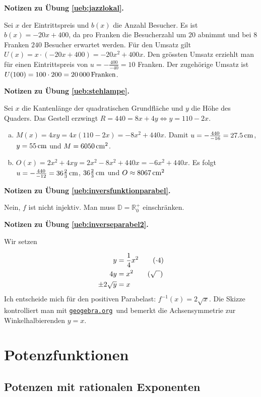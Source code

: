 \documentclass[%
11pt,%
twoside,%
titlepage,%
german,%
headsepline%
]{scrartcl}
\newcommand{\geogebralink}{\href{https://www.geogebra.org/calculator}{\texttt{geogebra.org}}}
\newcommand{\concatueb}[1]{ueb:#1}%
\newcommand{\concatlsg}[1]{lsg:#1}%
\newenvironment{lsg}[1]{%
    \par\noindent\textbf{Notizen zu Übung \ref{\concatueb{#1}}.}%
    \label{\concatlsg{#1}}
}{%
    \par%
}
\begin{document}
\begin{lsg}{jazzlokal}
    Sei $x$ der Eintrittspreis und $b(x)$ die Anzahl Besucher. Es ist $b(x)=-20x+400$, da pro Franken die Besucherzahl um $20$ abnimmt und bei $8$ Franken $240$ Besucher erwartet werden. Für den Umsatz gilt $U(x)=x\cdot(-20x+400)=-20x^2+400x$. Den grössten Umsatz erziehlt man für einen Eintrittspreis von $u=-\frac{400}{-40}=10$ Franken. Der zugehörige Umsatz ist $U(100)=100\cdot200=\unit[20\,000]{Franken}$.
\end{lsg}
\begin{lsg}{stehlampe}
    Sei $x$ die Kantenlänge der quadratischen Grundfläche und $y$ die Höhe des Quaders. Das Gestell erzwingt $R=440=8x+4y\Leftrightarrow y=110-2x$.
    \begin{enumerate}[a)]
        \item $M(x)=4xy=4x(110-2x)=-8x^2+440x$. Damit $u=-\frac{440}{-16}=\unit[27.5]{cm}$, $y=\unit[55]{cm}$ und $M=\unit[6050]{cm^2}$.
        \item $O(x)=2x^2+4xy=2x^2-8x^2+440x=-6x^2+440x$. Es folgt $u=-\frac{440}{-12}=\unit[36\frac{2}{3}]{cm}$, $\unit[36\frac{2}{3}]{cm}$ und $O\approx\unit[8067]{cm^2}$
    \end{enumerate}
\end{lsg}
\begin{lsg}{inversfunktionparabel}
    Nein, $f$ ist nicht injektiv. Man muss $\mathbb{D}=\mathbb{R}^+_0$ einschränken.
\end{lsg}
\begin{lsg}{inverseparabel2}
    Wir setzen

    \begin{align*}
        y &= \frac{1}{4}x^2\tag{$\cdot 4$}\\
        4y &= x^2\tag{$\sqrt{\phantom{x}}$}\\
        \pm2\sqrt{y} &= x
    \end{align*}
    Ich entscheide mich für den positiven Parabelast: $f^{-1}(x)=2\sqrt{x}$. Die Skizze kontrolliert man mit \geogebralink\ und bemerkt die Achsensymmetrie zur Winkelhalbierenden $y=x$.
\end{lsg}

\clearpage
 
\section{Potenzfunktionen}
  
\subsection{Potenzen mit rationalen Exponenten}
\end{document}
